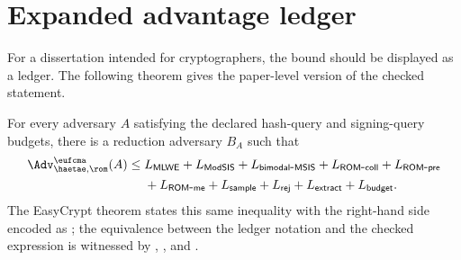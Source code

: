 \section{Expanded advantage ledger}
\label{sec:synthesis-expanded-ledger}

For a dissertation intended for cryptographers, the bound should be displayed as
a ledger.  The following theorem gives the paper-level version of the checked
statement.

\begin{theorem}
\label{thm:ledger-form-haetae-security}
For every adversary \(A\) satisfying the declared hash-query and signing-query
budgets, there is a reduction adversary \(B_A\) such that
\[
\begin{aligned}
  \Adv_{\haetae,\rom}^{\eufcma}(A)
  \le{}&
  L_{\mathsf{MLWE}}
  + L_{\mathsf{ModSIS}}
  + L_{\mathsf{bimodal\mbox{-}MSIS}}
  + L_{\mathsf{ROM\mbox{-}coll}}
  + L_{\mathsf{ROM\mbox{-}pre}} \\
  &+ L_{\mathsf{ROM\mbox{-}me}}
  + L_{\mathsf{sample}}
  + L_{\mathsf{rej}}
  + L_{\mathsf{extract}}
  + L_{\mathsf{budget}} .
\end{aligned}
\]
The EasyCrypt theorem states this same inequality with the right-hand side
encoded as ; the equivalence between the
ledger notation and the checked expression is witnessed by
, , and
.
\end{theorem}

